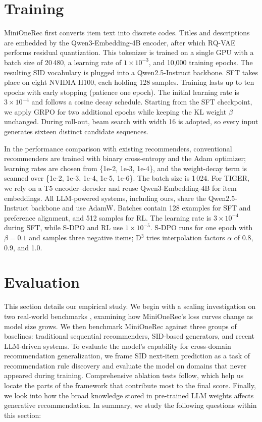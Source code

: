 \section{Training}
\label{training_detail}

MiniOneRec first converts item text into discrete codes. Titles and descriptions are embedded by the Qwen3-Embedding-4B encoder, after which RQ-VAE performs residual quantization. This tokenizer is trained on a single GPU with a batch size of 20\,480, a learning rate of $1\times10^{-3}$, and 10,000 training epochs. The resulting SID vocabulary is plugged into a Qwen2.5-Instruct backbone. SFT takes place on eight NVIDIA H100, each holding 128 samples. Training lasts up to ten epochs with early stopping (patience one epoch). The initial learning rate is $3\times10^{-4}$ and follows a cosine decay schedule. Starting from the SFT checkpoint, we apply GRPO for two additional epochs while keeping the KL weight $\beta$ unchanged. During roll-out, beam search with width 16 is adopted, so every input generates sixteen distinct candidate sequences.

In the performance comparison with existing recommenders, conventional recommenders are trained with binary cross-entropy and the Adam optimizer; learning rates are chosen from \{1e-2, 1e-3, 1e-4\}, and the weight-decay term is scanned over \{1e-2, 1e-3, 1e-4, 1e-5, 1e-6\}. The batch size is 1\,024.  
For TIGER, we rely on a T5 encoder–decoder and reuse Qwen3-Embedding-4B for item embeddings.  
All LLM-powered systems, including ours, share the Qwen2.5-Instruct backbone and use AdamW. Batches contain 128 examples for SFT and preference alignment, and 512 samples for RL. The learning rate is $3\times10^{-4}$ during SFT, while S-DPO and RL use $1\times10^{-5}$. S-DPO runs for one epoch with $\beta=0.1$ and samples three negative items; D$^{3}$ tries interpolation factors $\alpha$ of 0.8, 0.9, and 1.0.

\section{Evaluation}
\label{results}

This section details our empirical study. We begin with a scaling investigation on two real-world benchmarks \citep{amazon}, examining how MiniOneRec’s loss curves change as model size grows. We then benchmark MiniOneRec against three groups of baselines: traditional sequential recommenders, SID-based generators, and recent LLM-driven systems.  
To evaluate the model’s capability for cross-domain recommendation generalization, we frame SID next-item prediction as a task of recommendation rule discovery and evaluate the model on domains that never appeared during training.  
Comprehensive ablation tests follow, which help us locate the parts of the framework that contribute most to the final score. Finally, we look into how the broad knowledge stored in pre-trained LLM weights affects generative recommendation.
In summary, we study the following questions within this section:

